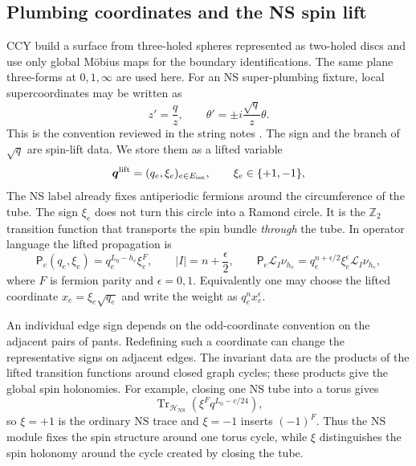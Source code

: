\documentclass[11pt]{article}
\newcommand{\NS}{\mathrm{NS}}
\begin{document}
\subsection{Plumbing coordinates and the NS spin lift}
\label{sec:block-definition}

CCY build a surface from three-holed spheres represented as two-holed discs
and use only global M\"obius maps for the boundary identifications.  The same
plane three-forms at \(0,1,\infty\) are used here.  For an NS super-plumbing
fixture, local supercoordinates may be written as
\begin{equation}
 z'=\frac qz,
 \qquad
 \theta'=\pm i\frac{\sqrt q}{z}\theta.
 \label{eq:super-plumbing}
\end{equation}
This is the convention reviewed in the string notes
\cite{YinFoundationsStringTheory}.  The sign and the branch of \(\sqrt q\)
are spin-lift data.  We store them as a lifted variable
\begin{equation}
 \bm q^{\rm lift}=(q_e,\xi_e)_{e\in E_{\rm int}},
 \qquad \xi_e\in\{+1,-1\},
 \label{eq:lifted-q}
\end{equation}
The NS label already fixes antiperiodic fermions around the circumference of
the tube.  The sign \(\xi_e\) does not turn this circle into a Ramond circle.
It is the \(\mathbb Z_2\) transition function that transports the spin bundle
\emph{through} the tube.  In operator language the lifted propagation is
\begin{equation}
 \mathsf P_e(q_e,\xi_e)=q_e^{L_0-h_e}\xi_e^F,
 \qquad
 |I|=n+\frac\epsilon2,
 \qquad
 \mathsf P_e\mathcal L_I\nu_{h_e}
 =q_e^{n+\epsilon/2}\xi_e^\epsilon
  \mathcal L_I\nu_{h_e},
 \label{eq:lifted-ns-propagation}
\end{equation}
where \(F\) is fermion parity and \(\epsilon=0,1\).  Equivalently one may
choose the lifted coordinate \(x_e=\xi_e\sqrt{q_e}\) and write the weight as
\(q_e^n x_e^\epsilon\).

An individual edge sign depends on the odd-coordinate convention on the
adjacent pairs of pants.  Redefining such a coordinate can change the
representative signs on adjacent edges.  The invariant data are the products
of the lifted transition functions around closed graph cycles; these products
give the global spin holonomies.  For example, closing one NS tube into a
torus gives
\begin{equation}
 \operatorname{Tr}_{\mathcal H_{\NS}}
 \!\left(\xi^Fq^{L_0-c/24}\right),
 \label{eq:torus-spin-lift-trace}
\end{equation}
so \(\xi=+1\) is the ordinary NS trace and \(\xi=-1\) inserts
\((-1)^F\).  Thus the NS module fixes the spin structure around one torus
cycle, while \(\xi\) distinguishes the spin holonomy around the cycle created
by closing the tube.
\end{document}
